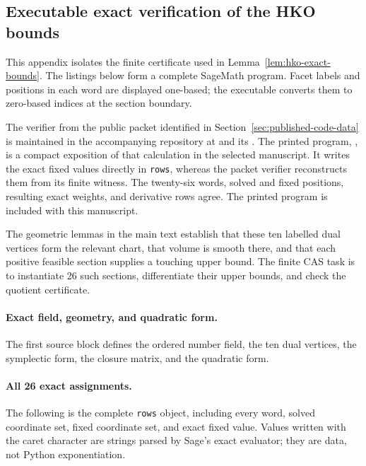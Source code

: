 \subsection{Executable exact verification of the HKO bounds}
\label{app:hko-cas}

This appendix isolates the finite certificate used in
Lemma~\ref{lem:hko-exact-bounds}. The listings below form a complete
SageMath program. Facet labels and positions in each word are
displayed one-based; the executable converts them to zero-based indices at
the section boundary.

\begin{sloppypar}
The verifier from the public packet identified in Section~\ref{sec:published-code-data}
is maintained in the accompanying repository at
 and its
. The printed program,
, is a compact exposition of that
calculation in the selected manuscript. It writes the exact fixed values
directly in \texttt{rows}, whereas the packet verifier reconstructs them
from its finite witness. The twenty-six words, solved and fixed positions,
resulting exact weights, and derivative rows agree. The printed program
is included with this manuscript.

\end{sloppypar}

The geometric lemmas in the main text establish that these ten labelled dual
vertices form the relevant chart, that volume is smooth there, and that each
positive feasible section supplies a touching upper bound.  The finite CAS
task is to instantiate 26 such sections, differentiate their upper bounds,
and check the quotient certificate.

\paragraph{Exact field, geometry, and quadratic form.}
The first source block defines the ordered number field, the ten dual
vertices, the symplectic form, the closure matrix, and the quadratic form.



\paragraph{All 26 exact assignments.}
The following is the complete \texttt{rows} object, including every word, solved
coordinate set, fixed coordinate set, and exact fixed value.  Values written
with the caret character are strings parsed by Sage's exact evaluator; they are data, not
Python exponentiation.

